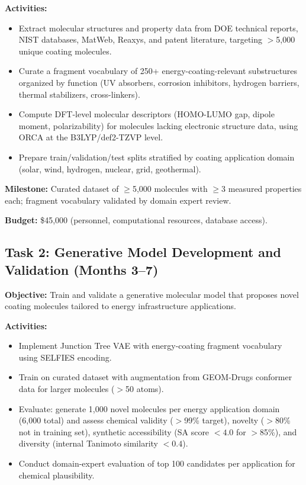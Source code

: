 \documentclass[11pt,letterpaper]{article}
\begin{document}
\textbf{Activities:}
\begin{itemize}[noitemsep]
  \item Extract molecular structures and property data from DOE technical reports, NIST databases, MatWeb, Reaxys, and patent literature, targeting $>$5,000 unique coating molecules.
  \item Curate a fragment vocabulary of 250+ energy-coating-relevant substructures organized by function (UV absorbers, corrosion inhibitors, hydrogen barriers, thermal stabilizers, cross-linkers).
  \item Compute DFT-level molecular descriptors (HOMO-LUMO gap, dipole moment, polarizability) for molecules lacking electronic structure data, using ORCA at the B3LYP/def2-TZVP level.
  \item Prepare train/validation/test splits stratified by coating application domain (solar, wind, hydrogen, nuclear, grid, geothermal).
\end{itemize}

\textbf{Milestone:} Curated dataset of $\geq$5,000 molecules with $\geq$3 measured properties each; fragment vocabulary validated by domain expert review.

\textbf{Budget:} \$45,000 (personnel, computational resources, database access).

\subsection{Task 2: Generative Model Development and Validation (Months 3--7)}

\textbf{Objective:} Train and validate a generative molecular model that proposes novel coating molecules tailored to energy infrastructure applications.

\textbf{Activities:}
\begin{itemize}[noitemsep]
  \item Implement Junction Tree VAE with energy-coating fragment vocabulary using SELFIES encoding.
  \item Train on curated dataset with augmentation from GEOM-Drugs conformer data for larger molecules ($>$50 atoms).
  \item Evaluate: generate 1,000 novel molecules per energy application domain (6,000 total) and assess chemical validity ($>$99\% target), novelty ($>$80\% not in training set), synthetic accessibility (SA score $< 4.0$ for $>$85\%), and diversity (internal Tanimoto similarity $< 0.4$).
  \item Conduct domain-expert evaluation of top 100 candidates per application for chemical plausibility.
\end{itemize}
\end{document}
